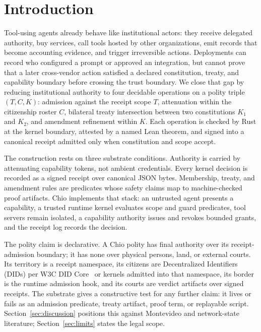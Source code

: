 \section{Introduction}

Tool-using agents already behave like institutional actors: they receive delegated authority, buy services, call tools hosted by other organizations, emit records that become accounting evidence, and trigger irreversible actions. Deployments can record who configured a prompt or approved an integration, but cannot prove that a later cross-vendor action satisfied a declared constitution, treaty, and capability boundary before crossing the trust boundary. We close that gap by reducing institutional authority to four decidable operations on a polity triple $(T, C, K)$: admission against the receipt scope $T$, attenuation within the citizenship roster $C$, bilateral treaty intersection between two constitutions $K_1$ and $K_2$, and amendment refinement within $K$. Each operation is checked by Rust at the kernel boundary, attested by a named Lean theorem, and signed into a canonical receipt admitted only when constitution and scope accept.

The construction rests on three substrate conditions. Authority is carried by attenuating capability tokens, not ambient credentials. Every kernel decision is recorded as a signed receipt over canonical JSON bytes. Membership, treaty, and amendment rules are predicates whose safety claims map to machine-checked proof artifacts. Chio implements that stack: an untrusted agent presents a capability, a trusted runtime kernel evaluates scope and guard predicates, tool servers remain isolated, a capability authority issues and revokes bounded grants, and the receipt log records the decision.

The polity claim is declarative. A Chio polity has final authority over its receipt-admission boundary; it has none over physical persons, land, or external courts. Its territory is a receipt namespace, its citizens are Decentralized Identifiers (DIDs) per W3C DID Core~\cite{w3cDidCore} or kernels admitted into that namespace, its border is the runtime admission hook, and its courts are verdict artifacts over signed receipts. The substrate gives a constructive test for any further claim: it lives or fails as an admission predicate, treaty artifact, proof term, or replayable script. Section~\ref{sec:discussion} positions this against Montevideo and network-state literature; Section~\ref{sec:limits} states the legal scope.

